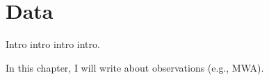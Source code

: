 \chapter{Data}
\begin{chapabstract}

Intro intro intro intro.

\end{chapabstract}

In this chapter, I will write about observations (e.g., MWA).
